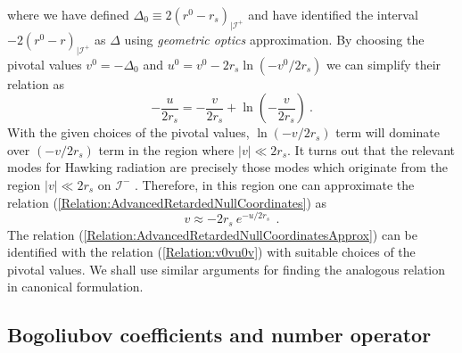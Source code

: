 \documentclass[aps,twocolumn,showpacs]{revtex4}
\def\rs{r_s}
\def\scriplus{\mathscr{I}^{+}}
\def\scriminus{\mathscr{I}^{-}}
\begin{document}
%
where we have defined $\Delta_0 \equiv 2(r^0 - \rs)_{|\scriplus}$ and have
identified the interval $-2(r^0 -r)_{|\scriplus}$ as $\Delta$ using 
\emph{geometric optics} approximation. By choosing the pivotal values  $v^0 = 
-\Delta_0$ and $u^0 = v^0 - 2\rs \ln (-v^0/2\rs)$ we can simplify their relation 
as 
%
\begin{equation}\label{Relation:AdvancedRetardedNullCoordinates}
- \frac{u}{2\rs} = - \frac{v}{2 \rs}  +  \ln \left(-\frac{v}{2 \rs}\right)  ~.
\end{equation}
%
With the given choices of the pivotal values, $\ln(-v/2\rs)$ term will dominate 
over $(-v/2\rs)$ term in the region where $|v| \ll 2\rs$. It turns out that the 
relevant modes for Hawking radiation are precisely those modes which originate 
from the region $|v| \ll 2\rs$ on $\scriminus$ . Therefore, in this region 
one can approximate the relation 
(\ref{Relation:AdvancedRetardedNullCoordinates}) as
%
\begin{equation}\label{Relation:AdvancedRetardedNullCoordinatesApprox}
v \approx -2\rs~ e^{-u/2 \rs} ~~.
\end{equation}
%
The relation (\ref{Relation:AdvancedRetardedNullCoordinatesApprox}) can be 
identified with the relation (\ref{Relation:v0vu0v}) with suitable choices of 
the pivotal values.  We shall use similar arguments for finding the analogous 
relation in canonical formulation.




\subsection{Bogoliubov coefficients and number operator}
\end{document}
